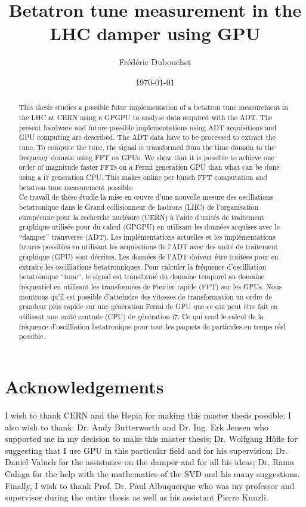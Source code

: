 \documentclass[a4paper]{report}
\title{Betatron tune measurement in the LHC damper using GPU}
\author{Fr{\'e}d{\'e}ric Dubouchet}
\date{\today}
\begin{document}


\begin{abstract}
  This thesis studies a possible futur implementation of a betatron tune measurement in the \gls{LHC} at \gls{CERN} using a \gls{GPGPU} to analyse data acquired with the \gls{ADT}. The present hardware and future possible implementations using \gls{ADT} acquisitions and \gls{GPU} computing are described. The \gls{ADT} data have to be processed to extract the \gls{tune}. To compute the tune, the signal is transformed from the time domain to the frequency domain using \gls{FFT} on \glspl{GPU}. We show that it is possible to achieve one order of magnitude faster \glspl{FFT} on a Fermi generation \gls{GPU} than what can be done using a i7 generation \gls{CPU}. This makes online per \gls{bunch} \gls{FFT} computation and betatron tune measurement possible.\\[2cm]

  Ce travail de th{\`e}se {\'e}tudie la mise en {\oe}uvre d'une nouvelle mesure des oscillations betatronique dans le Grand collisionneur de hadrons (LHC) de l'organisation europ{\'e}enne pour la recherche nucléaire (CERN) {\`a} l'aide d'unit{\'e}s de traitement graphique utilis{\'e}e pour du calcul (GPGPU) en utilisant les donn{\'e}es acquises avec le ``damper'' transverse (ADT). Les impl{\'e}mentations actuelles et les impl{\'e}mentations futures possibles en utilisant les acquisitions de l'ADT avec des unité de traitement graphique (GPU) sont d{\'e}crites. Les données de l'ADT doivent {\^e}tre trait{\'e}es pour en extraire les oscilliations betatronniques. Pour calculer la fr{\'e}quence d'oscilliation betatronique ``tune'', le signal est transform{\'e} du domaine temporel au domaine fr{\'e}quentiel en utilisant les transformées de Fourier rapide (FFT) sur les GPUs. Nous montrons qu'il est possible d'atteindre des vitesses de transformation un ordre de grandeur plus rapide sur une génération Fermi de GPU que ce qui peut être fait en utilisant une unit{\'e} centrale (CPU) de g{\'e}n{\'e}ration i7. Ce qui rend le calcul de la fr{\'e}quence d'oscilliation betatronique pour tout les paquets de particules en temps r{\'e}el possible.
\end{abstract}

\chapter*{Acknowledgements}

I wish to thank \gls{CERN} and the \gls{Hepia} for making this master thesis possible. I also wish to thank: Dr. Andy Butterworth and Dr. Ing. Erk Jensen who supported me in my decision to make this master thesis; Dr. Wolfgang H{\"o}fle for suggesting that I use GPU in this particular field and for his supervision; Dr. Daniel Valuch for the assistance on the damper and for all his ideas; Dr. Rama Calaga for the help with the mathematics of the \gls{SVD} and his many suggestions. Finally, I wish to thank Prof. Dr. Paul Albuquerque who was my professor and supervisor during the entire thesis as well as his assistant Pierre Kunzli.

\tableofcontents
\listoffigures
\listoftables









\printglossaries


\end{document}
